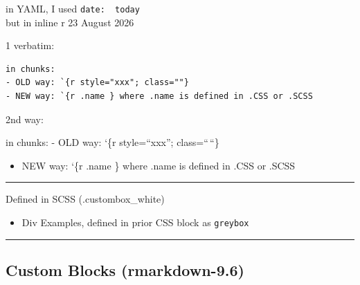 \documentclass[
]{report}
\providecommand{\tightlist}{%
  \setlength{\itemsep}{0pt}\setlength{\parskip}{0pt}}
\begin{document}
in YAML, I used \texttt{date:\ \ today}\\
but in inline r 23 August 2026

1 verbatim:

\begin{verbatim}
in chunks: 
- OLD way: `{r style="xxx"; class=""} 
- NEW way: `{r .name } where .name is defined in .CSS or .SCSS 
\end{verbatim}

\begin{tcolorbox}[enhanced jigsaw, arc=.35mm, bottomrule=.15mm, bottomtitle=1mm, breakable, colback=white, colbacktitle=quarto-callout-note-color!10!white, colframe=quarto-callout-note-color-frame, coltitle=black, left=2mm, leftrule=.75mm, opacityback=0, opacitybacktitle=0.6, rightrule=.15mm, title=\textcolor{quarto-callout-note-color}{\faInfo}\hspace{0.5em}{Note}, titlerule=0mm, toprule=.15mm, toptitle=1mm]

2nd way:

in chunks: - OLD way: `\{r style=``xxx''; class=``\,``\}

\begin{itemize}
\tightlist
\item
  NEW way: `\{r .name \} where .name is defined in .CSS or .SCSS
\end{itemize}

\end{tcolorbox}

\begin{center}\rule{0.5\linewidth}{0.5pt}\end{center}

Defined in SCSS (.custombox\_white)

\begin{itemize}
\tightlist
\item
  Div Examples, defined in prior CSS block as \texttt{greybox}
\end{itemize}

\begin{center}\rule{0.5\linewidth}{0.5pt}\end{center}

\subsection{Custom Blocks
(rmarkdown-9.6)}\label{custom-blocks-rmarkdown-9.6}

\end{document}
